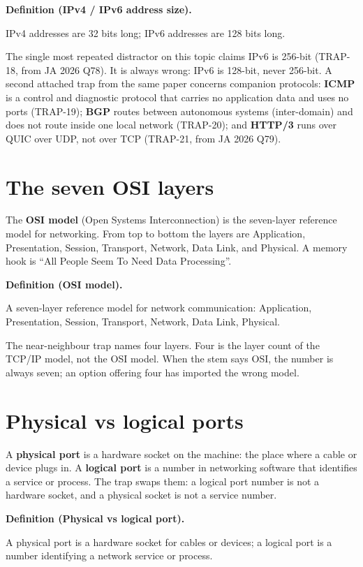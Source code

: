 \documentclass[11pt]{article}
\newenvironment{definitionbox}[1]{%
  \par\noindent\textbf{Definition (#1).}\ \itshape
}{\par\vspace{0.3em}}
\begin{document}
\begin{definitionbox}{IPv4 / IPv6 address size}
IPv4 addresses are 32 bits long; IPv6 addresses are 128 bits long.
\end{definitionbox}

The single most repeated distractor on this topic claims IPv6 is 256-bit
(TRAP-18, from JA 2026 Q78). It is always wrong: IPv6 is 128-bit, never
256-bit. A second attached trap from the same paper concerns companion
protocols: \textbf{ICMP} is a control and diagnostic protocol that carries no
application data and uses no ports (TRAP-19); \textbf{BGP} routes between
autonomous systems (inter-domain) and does not route inside one local network
(TRAP-20); and \textbf{HTTP/3} runs over QUIC over UDP, not over TCP
(TRAP-21, from JA 2026 Q79).

\section{The seven OSI layers}
The \textbf{OSI model} (Open Systems Interconnection) is the seven-layer
reference model for networking. From top to bottom the layers are
Application, Presentation, Session, Transport, Network, Data Link, and
Physical. A memory hook is ``All People Seem To Need Data Processing''.

\begin{definitionbox}{OSI model}
A seven-layer reference model for network communication: Application,
Presentation, Session, Transport, Network, Data Link, Physical.
\end{definitionbox}

The near-neighbour trap names four layers. Four is the layer count of the
TCP/IP model, not the OSI model. When the stem says OSI, the number is
always seven; an option offering four has imported the wrong model.

\section{Physical vs logical ports}
A \textbf{physical port} is a hardware socket on the machine: the place where
a cable or device plugs in. A \textbf{logical port} is a number in networking
software that identifies a service or process. The trap swaps them: a logical
port number is not a hardware socket, and a physical socket is not a service
number.

\begin{definitionbox}{Physical vs logical port}
A physical port is a hardware socket for cables or devices; a logical port is
a number identifying a network service or process.
\end{definitionbox}
\end{document}
